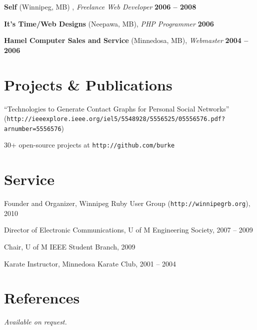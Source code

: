 \documentclass[margin,line,letterpaper]{resume}
\begin{document}
\begin{resume}
  {\bf Self} (Winnipeg, MB) , {\sl Freelance Web Developer} \hfill {\bf 2006 -- 2008}

  {\bf It's Time/Web Designs} (Neepawa, MB), {\sl PHP Programmer} \hfill {\bf 2006}

  {\bf Hamel Computer Sales and Service} (Minnedosa, MB), {\sl Webmaster} \hfill {\bf 2004 -- 2006}

  \section{\mysidestyle Projects \& Publications}

  \begin{list2}
  \item ``Technologies to Generate Contact Graphs for Personal Social Networks''\\ ({\tt http://ieeexplore.ieee.org/iel5/5548928/5556525/05556576.pdf?arnumber=5556576})
  \item 30+ open-source projects at {\tt http://github.com/burke}
 \end{list2}

  \section{\mysidestyle Service}

  \begin{list2}
    \item Founder and Organizer, Winnipeg Ruby User Group ({\tt http://winnipegrb.org}), 2010
    \item Director of Electronic Communications, U of M Engineering Society, 2007 -- 2009
    \item Chair, U of M IEEE Student Branch, 2009
    \item Karate Instructor, Minnedosa Karate Club, 2001 -- 2004
  \end{list2}

  \section{\mysidestyle References}

  {\sl Available on request.}

\end{resume}
\end{document}
